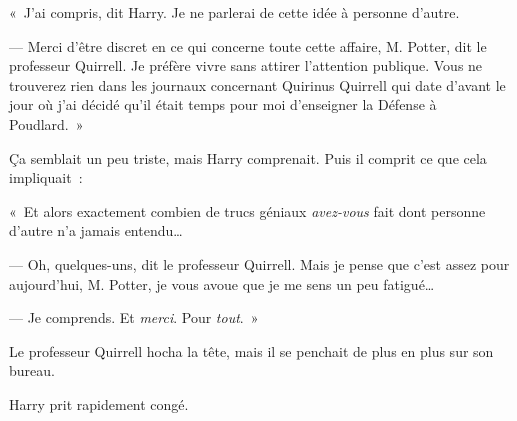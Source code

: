 «~J'ai compris, dit Harry. Je ne parlerai de cette idée à personne d'autre.

--- Merci d'être discret en ce qui concerne toute cette affaire, M. Potter, dit le professeur Quirrell. Je préfère vivre sans attirer l'attention publique. Vous ne trouverez rien dans les journaux concernant Quirinus Quirrell qui date d'avant le jour où j'ai décidé qu'il était temps pour moi d'enseigner la Défense à Poudlard.~»

Ça semblait un peu triste, mais Harry comprenait. Puis il comprit ce que cela impliquait~:

«~Et alors exactement combien de trucs géniaux \emph{avez-vous} fait dont personne d'autre n'a jamais entendu…

--- Oh, quelques-uns, dit le professeur Quirrell. Mais je pense que c'est assez pour aujourd'hui, M. Potter, je vous avoue que je me sens un peu fatigué…

--- Je comprends. Et \emph{merci}. Pour \emph{tout}.~»

Le professeur Quirrell hocha la tête, mais il se penchait de plus en plus sur son bureau.

Harry prit rapidement congé.~
